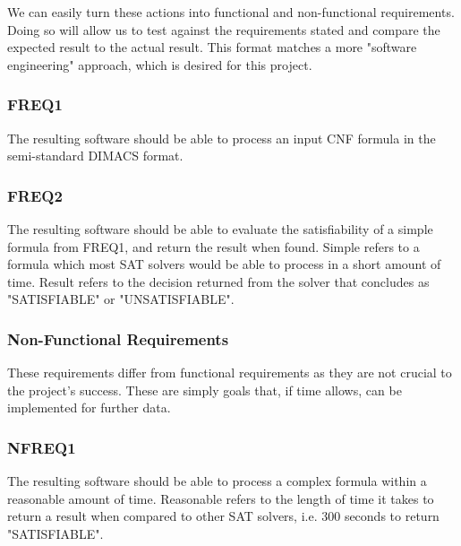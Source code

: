 \documentclass{article}
\begin{document}
We can easily turn these actions into functional and non-functional requirements. Doing so will allow us to test against the
requirements stated and compare the expected result to the actual result. This format matches a more "software engineering"
approach, which is desired for this project.

\subsubsection{FREQ1}
The resulting software should be able to process an input CNF formula in the semi-standard DIMACS format.

\subsubsection{FREQ2}
The resulting software should be able to evaluate the satisfiability of a simple formula from FREQ1, and return the result when
found. Simple refers to a formula which most SAT solvers would be able to process in a short amount of time. Result refers to the
decision returned from the solver that concludes as "SATISFIABLE" or "UNSATISFIABLE".

\subsubsection{Non-Functional Requirements}
These requirements differ from functional requirements as they are not crucial to the project's success. These are simply goals
that, if time allows, can be implemented for further data.

\subsubsection{NFREQ1}
The resulting software should be able to process a complex formula within a reasonable amount of time. Reasonable refers to the
length of time it takes to return a result when compared to other SAT solvers, i.e. 300 seconds to return "SATISFIABLE".

\end{document}

